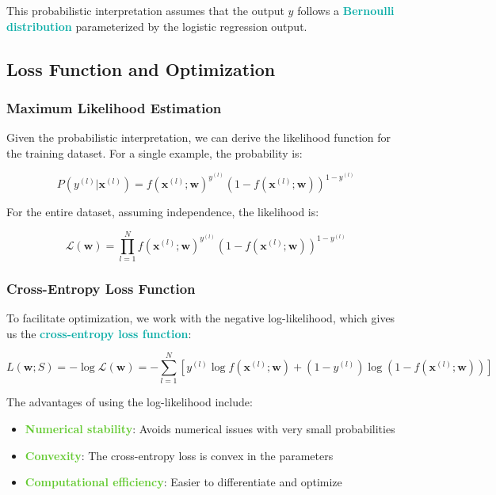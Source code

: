 \documentclass[twoside]{article}
\newcommand{\highlightbluetext}[1]{\textcolor[HTML]{09ACA6}{\textbf{#1}}}
\newcommand{\highlightgreentext}[1]{\textcolor[HTML]{62C92F}{\textbf{#1}}}
\numberwithin{equation}{section}
\begin{document}
	This probabilistic interpretation assumes that the output $y$ follows a \highlightbluetext{Bernoulli distribution} parameterized by the logistic regression output.

	\subsection{Loss Function and Optimization}
	\label{subsec:LossFunctionAndOptimization}

	\subsubsection{Maximum Likelihood Estimation}
	\label{subsubsec:MaximumLikelihoodEstimation}
	Given the probabilistic interpretation, we can derive the likelihood function for the training dataset. For a single example, the probability is:

	\begin{equation}
		P(y^{(l)} | \mathbf{x}^{(l)}) = f(\mathbf{x}^{(l)}; \mathbf{w})^{y^{(l)}} (1 - f(\mathbf{x}^{(l)}; \mathbf{w}))^{1-y^{(l)}}
	\end{equation}

	For the entire dataset, assuming independence, the likelihood is:

	\begin{equation}
	\label{eq:Likelihood}
		\boxed{\mathcal{L}(\mathbf{w}) = \prod_{l=1}^{N} f(\mathbf{x}^{(l)}; \mathbf{w})^{y^{(l)}} (1 - f(\mathbf{x}^{(l)}; \mathbf{w}))^{1-y^{(l)}}}
	\end{equation}

	\subsubsection{Cross-Entropy Loss Function}
	\label{subsubsec:CrossEntropyLossFunction}
	To facilitate optimization, we work with the negative log-likelihood, which gives us the \highlightbluetext{cross-entropy loss function}:

	\begin{equation}
	\label{eq:CrossEntropyLoss}
		\boxed{L(\mathbf{w}; S) = -\log \mathcal{L}(\mathbf{w}) = -\sum_{l=1}^{N} \left[ y^{(l)} \log f(\mathbf{x}^{(l)}; \mathbf{w}) + (1 - y^{(l)}) \log(1 - f(\mathbf{x}^{(l)}; \mathbf{w})) \right]}
	\end{equation}

	The advantages of using the log-likelihood include:
	\begin{itemize}
		\item \highlightgreentext{Numerical stability}: Avoids numerical issues with very small probabilities
		\item \highlightgreentext{Convexity}: The cross-entropy loss is convex in the parameters
		\item \highlightgreentext{Computational efficiency}: Easier to differentiate and optimize
	\end{itemize}
\end{document}

